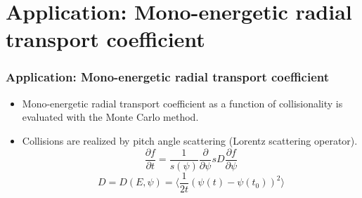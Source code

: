 \documentclass{beamer}
\newcommand{\be}[1]{\begin{equation} \label{#1}}
\newcommand{\ee}{\end{equation}}
\begin{document}
%

\section{Application: Mono-energetic radial transport coefficient}


\begin{frame}
\frametitle{Application: Mono-energetic radial transport coefficient}
\vspace{-0.5cm}
\begin{itemize}
	\item Mono-energetic radial transport coefficient as a function of collisionality is evaluated with the Monte Carlo method.
	\item Collisions are realized by pitch angle scattering (Lorentz scattering operator).\\
	\be{}
	\frac{\partial f}{\partial t} = \frac{1}{s \left(\psi \right)} \frac{\partial}{\partial \psi}s D 	\frac{\partial f}{\partial \psi} 
	\ee
	\be{}
	D = D(E,\psi) = \langle \frac{1}{2t} \left( \psi  \left(t\right) - \psi \left( t_0 \right) \right)^2 \rangle
	\ee
\end{itemize}
\end{frame}
\end{document}
